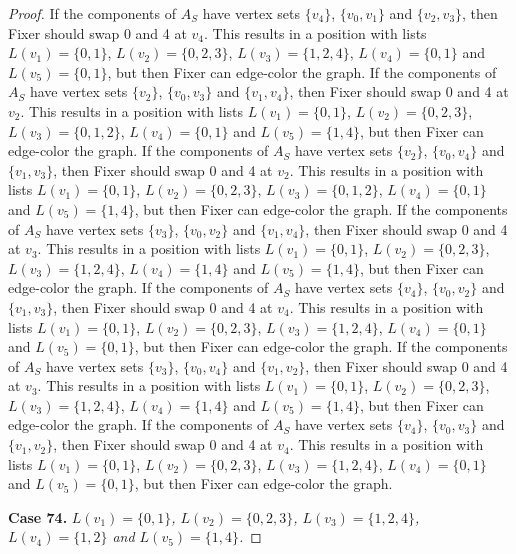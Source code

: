 \documentclass[12pt]{amsart}
\theoremstyle{plain}
\theoremstyle{definition}
\theoremstyle{remark}
\begin{document}
\begin{proof}
If the components of $A_S$ have vertex sets $\{v_4\}$, $\{v_0, v_1\}$ and $\{v_2, v_3\}$, then Fixer should swap 0 and 4 at $v_4$. This results in a position with lists $L(v_1) = \{0, 1\}$, $L(v_2) = \{0, 2, 3\}$, $L(v_3) = \{1, 2, 4\}$, $L(v_4) = \{0, 1\}$ and $L(v_5) = \{0, 1\}$, but then Fixer can edge-color the graph.
If the components of $A_S$ have vertex sets $\{v_2\}$, $\{v_0, v_3\}$ and $\{v_1, v_4\}$, then Fixer should swap 0 and 4 at $v_2$. This results in a position with lists $L(v_1) = \{0, 1\}$, $L(v_2) = \{0, 2, 3\}$, $L(v_3) = \{0, 1, 2\}$, $L(v_4) = \{0, 1\}$ and $L(v_5) = \{1, 4\}$, but then Fixer can edge-color the graph.
If the components of $A_S$ have vertex sets $\{v_2\}$, $\{v_0, v_4\}$ and $\{v_1, v_3\}$, then Fixer should swap 0 and 4 at $v_2$. This results in a position with lists $L(v_1) = \{0, 1\}$, $L(v_2) = \{0, 2, 3\}$, $L(v_3) = \{0, 1, 2\}$, $L(v_4) = \{0, 1\}$ and $L(v_5) = \{1, 4\}$, but then Fixer can edge-color the graph.
If the components of $A_S$ have vertex sets $\{v_3\}$, $\{v_0, v_2\}$ and $\{v_1, v_4\}$, then Fixer should swap 0 and 4 at $v_3$. This results in a position with lists $L(v_1) = \{0, 1\}$, $L(v_2) = \{0, 2, 3\}$, $L(v_3) = \{1, 2, 4\}$, $L(v_4) = \{1, 4\}$ and $L(v_5) = \{1, 4\}$, but then Fixer can edge-color the graph.
If the components of $A_S$ have vertex sets $\{v_4\}$, $\{v_0, v_2\}$ and $\{v_1, v_3\}$, then Fixer should swap 0 and 4 at $v_4$. This results in a position with lists $L(v_1) = \{0, 1\}$, $L(v_2) = \{0, 2, 3\}$, $L(v_3) = \{1, 2, 4\}$, $L(v_4) = \{0, 1\}$ and $L(v_5) = \{0, 1\}$, but then Fixer can edge-color the graph.
If the components of $A_S$ have vertex sets $\{v_3\}$, $\{v_0, v_4\}$ and $\{v_1, v_2\}$, then Fixer should swap 0 and 4 at $v_3$. This results in a position with lists $L(v_1) = \{0, 1\}$, $L(v_2) = \{0, 2, 3\}$, $L(v_3) = \{1, 2, 4\}$, $L(v_4) = \{1, 4\}$ and $L(v_5) = \{1, 4\}$, but then Fixer can edge-color the graph.
If the components of $A_S$ have vertex sets $\{v_4\}$, $\{v_0, v_3\}$ and $\{v_1, v_2\}$, then Fixer should swap 0 and 4 at $v_4$. This results in a position with lists $L(v_1) = \{0, 1\}$, $L(v_2) = \{0, 2, 3\}$, $L(v_3) = \{1, 2, 4\}$, $L(v_4) = \{0, 1\}$ and $L(v_5) = \{0, 1\}$, but then Fixer can edge-color the graph.

\noindent\textbf{Case 74.  }\textit{$L(v_1) = \{0, 1\}$, $L(v_2) = \{0, 2, 3\}$, $L(v_3) = \{1, 2, 4\}$, $L(v_4) = \{1, 2\}$ and $L(v_5) = \{1, 4\}$.}


\end{proof}
\end{document}
